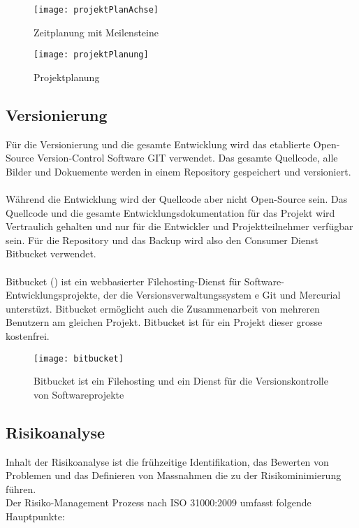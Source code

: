 \begin{figure}[htb!]
	\begin{center}
		\texttt{[image: projektPlanAchse]}
		\caption[Projektplanung Meilensteine]{Zeitplanung mit Meilensteine}
		\label{fig:projektPlanungAchse}
	\end{center}
\end{figure}


\begin{figure}[htb!]
	\begin{center}
		\texttt{[image: projektPlanung]}
		\caption[Projektplanung]{Projektplanung}
		\label{fig:projektPlanung}
	\end{center}
\end{figure}

\subsection{Versionierung}
Für die Versionierung und die gesamte Entwicklung wird das etablierte Open-Source Version-Control Software GIT verwendet. Das gesamte Quellcode, alle Bilder und Dokuemente werden in einem Repository gespeichert und versioniert.
\\
\\
Während die Entwicklung wird der Quellcode aber nicht Open-Source sein. Das Quellcode und die gesamte Entwicklungsdokumentation für das Projekt wird Vertraulich gehalten und nur für die Entwickler und Projektteilnehmer verfügbar sein. Für die Repository und das Backup wird also den Consumer Dienst Bitbucket verwendet.
\\
\\
Bitbucket () ist ein webbasierter Filehosting-Dienst für Software-Entwicklungsprojekte, der die Versionsverwaltungssystem e Git und Mercurial unterstüzt. Bitbucket ermöglicht auch die Zusammenarbeit von mehreren Benutzern am gleichen Projekt. Bitbucket ist für ein Projekt dieser grosse kostenfrei.
\begin{figure}[htb!]
	\begin{center}
		\texttt{[image: bitbucket]}
		\caption[Bitbucket ist ein Filehosting und ein Dienst für die Versionskontrolle von Softwareprojekte]{Bitbucket ist ein Filehosting und ein Dienst für die Versionskontrolle von Softwareprojekte}
		\label{fig:bitbucket}
	\end{center}
\end{figure}

\subsection{Risikoanalyse}
Inhalt der Risikoanalyse ist die frühzeitige Identifikation, das Bewerten von Problemen und das Definieren von Massnahmen die zu der Risikominimierung führen.
\\
Der Risiko-Management Prozess nach ISO 31000:2009 umfasst folgende Hauptpunkte: 

